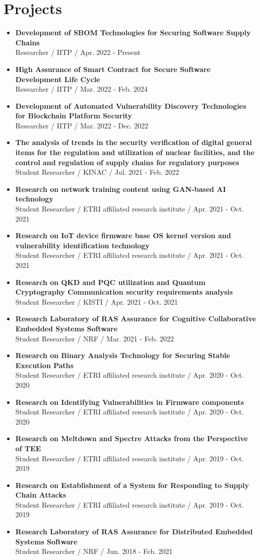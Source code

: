\documentclass[letterpaper,11pt]{article}
\newcommand{\resumeItem}[1]{
  \item\small{
    {#1 \vspace{-2pt}}
  }
}
\newcommand{\resumeItemListStart}{\begin{itemize}}
\newcommand{\resumeItemListEnd}{\end{itemize}\vspace{-5pt}}
\begin{document}
\section{Projects}
    \vspace{3pt}
    \resumeItemListStart
      \resumeItem{\textbf{Development of SBOM Technologies for Securing Software Supply Chains
      } \\ Researcher / IITP / Apr. 2022 - Present}
      \resumeItem{\textbf{High Assurance of Smart Contract for Secure Software Development Life Cycle} \\ Researcher / IITP / Mar. 2022 - Feb. 2024}
      \resumeItem{\textbf{Development of Automated Vulnerability Discovery Technologies for Blockchain Platform Security} \\ Researcher / IITP / Mar. 2022 - Dec. 2022}
      \resumeItem{\textbf{The analysis of trends in the security verification of digital general items for the regulation and utilization of nuclear facilities, and the control and regulation of supply chains for regulatory purposes} \\ Student Researcher / KINAC / Jul. 2021 - Feb. 2022}
      \resumeItem{\textbf{Research on network training content using GAN-based AI technology} \\ Student Researcher / ETRI affiliated research institute / Apr. 2021 - Oct. 2021}
      \resumeItem{\textbf{Research on IoT device firmware base OS kernel version and vulnerability identification technology} \\ Student Researcher / ETRI affiliated research institute / Apr. 2021 - Oct. 2021}
      \resumeItem{\textbf{Research on QKD and PQC utilization and Quantum Cryptography Communication security requirements analysis} \\ Student Researcher / KISTI / Apr. 2021 - Oct. 2021}
      \resumeItem{\textbf{Research Laboratory of RAS Assurance for Cognitive Collaborative Embedded Systems Software} \\ Student Researcher / NRF / Mar. 2021 - Feb. 2022}
      \resumeItem{\textbf{Research on Binary Analysis Technology for Securing Stable Execution Paths} \\ Student Researcher / ETRI affiliated research institute / Apr. 2020 - Oct. 2020}
      \resumeItem{\textbf{Research on Identifying Vulnerabilities in Firmware components} \\ Student Researcher / ETRI affiliated research institute / Apr. 2020 - Oct. 2020}
      \resumeItem{\textbf{Research on Meltdown and Spectre Attacks from the Perspective of TEE} \\ Student Researcher / ETRI affiliated research institute / Apr. 2019 - Oct. 2019}
      \resumeItem{\textbf{Research on Establishment of a System for Responding to Supply Chain Attacks} \\ Student Researcher / ETRI affiliated research institute / Apr. 2019 - Oct. 2019}
      \resumeItem{\textbf{Research Laboratory of RAS Assurance for Distributed Embedded Systems Software} \\ Student Researcher / NRF / Jun. 2018 - Feb. 2021}
    \resumeItemListEnd
\end{document}
